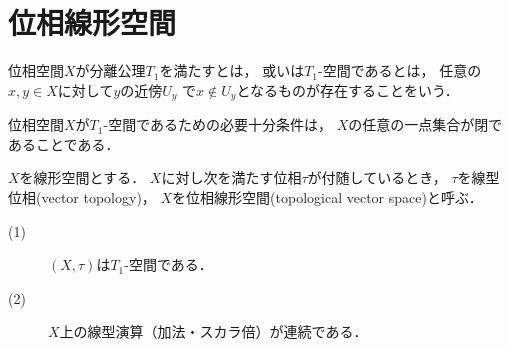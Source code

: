 \section{位相線形空間}
	位相空間$X$が分離公理$T_1$を満たすとは，
	或いは$T_1$-空間であるとは，
	任意の$x,y \in X$に対して$y$の近傍$U_y$
	で$x \notin U_y$となるものが存在することをいう．
	
	\begin{screen}
		\begin{thm}[$T_1$-空間の特徴づけ]
			位相空間$X$が$T_1$-空間であるための必要十分条件は，
			$X$の任意の一点集合が閉であることである．
		\end{thm}
	\end{screen}
	
	\begin{screen}
		\begin{dfn}[位相線形空間]
			$X$を線形空間とする．
			$X$に対し次を満たす位相$\tau$が付随しているとき，
			$\tau$を線型位相(vector topology)，
			$X$を位相線形空間(topological vector space)と呼ぶ．
			\begin{description}
				\item[(1)] $(X,\tau)$は$T_1$-空間である．
				\item[(2)] $X$上の線型演算（加法・スカラ倍）が連続である．
			\end{description}
		\end{dfn}
	\end{screen}